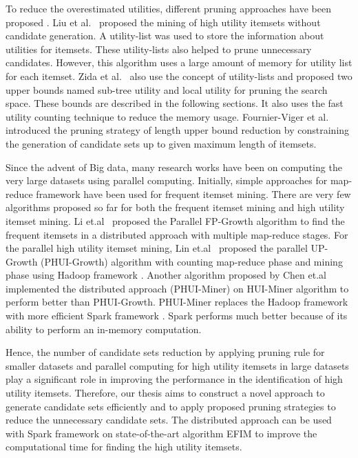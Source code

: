 \documentclass[11pt,openright]{report}
\begin{document}
To reduce the overestimated utilities, different pruning approaches have been proposed \cite{Chu2009, Liu2012, Lan2014, Krishnamoorthy2015, Zida2015, Tseng2013, Fournier-Viger2014, Song2014, Fournier-Viger2016}. Liu et al.~\cite{Liu2012} proposed the mining of high utility itemsets without candidate generation. A utility-list was used to store the information about utilities for itemsets. These utility-lists also helped to prune unnecessary candidates. However, this algorithm uses a large amount of memory for utility list for each itemset. Zida et al.~\cite{Zida2015} also use the concept of utility-lists and proposed two upper bounds named sub-tree utility and local utility for pruning the search space. These bounds are described in the following sections. It also uses the fast utility counting technique to reduce the memory usage. Fournier-Viger et al.~\cite{Fournier-Viger2016} introduced the pruning strategy of length upper bound reduction by constraining the generation of candidate sets up to given maximum length of itemsets.

Since the advent of Big data, many research works have been on computing the very large datasets using parallel computing. Initially, simple approaches for map-reduce framework have been used for frequent itemset mining\cite{Yang2010,Cryans2010}. There are very few algorithms proposed so far for both the frequent itemset mining and high utility itemset mining. Li et.al~\cite{Li2008} proposed the Parallel FP-Growth algorithm to find the frequent itemsets in a distributed approach with multiple map-reduce stages. For the parallel high utility itemset mining, Lin et.al~\cite{Lin2015} proposed the parallel UP-Growth (PHUI-Growth) algorithm with counting map-reduce phase and mining phase using Hadoop framework \cite{Dean2008}. Another algorithm proposed by Chen et.al~\cite{Chen2016} implemented the distributed approach (PHUI-Miner) on HUI-Miner algorithm \cite{Liu2012} to perform better than PHUI-Growth. PHUI-Miner replaces the Hadoop framework \cite{Dean2008} with more efficient Spark framework \cite{Zaharia2010}. Spark performs much better because of its ability to perform an in-memory computation.

Hence, the number of candidate sets reduction by applying pruning rule for smaller datasets and parallel computing for high utility itemsets in large datasets play a significant role in improving the performance in the identification of high utility itemsets. Therefore, our thesis aims to construct a novel approach to generate candidate sets efficiently and to apply proposed pruning strategies to reduce the unnecessary candidate sets. The distributed approach can be used with Spark framework on state-of-the-art algorithm EFIM \cite{Zida2015} to improve the computational time for finding the high utility itemsets.
\end{document}
